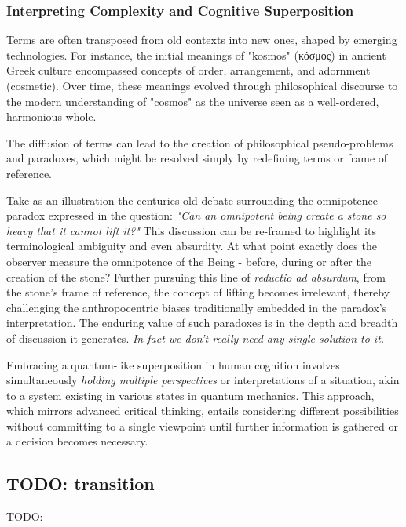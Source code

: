 \documentclass[11pt,a4]{article}
\newcommand{\textgreek}[1]{\begingroup\fontencoding{LGR}\selectfont#1\endgroup}
\begin{document}
    \subsubsection{Interpreting Complexity and Cognitive Superposition}
        \par
        Terms are often transposed from old contexts into new ones, shaped by emerging technologies.
        For instance,  the initial meanings of "kosmos" (\textgreek{κόσμος}) in ancient Greek culture encompassed concepts of order, arrangement, and adornment (cosmetic). Over time, these meanings evolved through philosophical discourse to the modern understanding of "cosmos" as the universe seen as a well-ordered, harmonious whole.
        \par
        The diffusion of  terms can lead to the creation of philosophical pseudo-problems and paradoxes, which might be resolved simply by redefining terms or frame of reference.
        \par

        Take as an illustration the centuries-old debate surrounding the
        omnipotence paradox expressed in the question: \textit{"Can an omnipotent being create a stone so heavy that it cannot lift it?"} This discussion can be re-framed to highlight its terminological ambiguity and even absurdity.
        At what point exactly does the observer measure the omnipotence of the Being - before, during or after the creation of the stone?
        Further pursuing this line of \textit{reductio ad absurdum}, from the stone's frame of reference, the concept of lifting becomes irrelevant, thereby challenging the anthropocentric biases traditionally embedded in the paradox’s interpretation.
        The enduring value of such paradoxes is in the depth and breadth of discussion it generates. \textit{In fact we don't really need any single solution to it.}
        \par

        Embracing a quantum-like superposition in human cognition involves simultaneously \textit{holding multiple perspectives} or interpretations of a situation, akin to a system existing in various states in quantum mechanics. This approach, which mirrors advanced critical thinking, entails considering different possibilities without committing to a single viewpoint until further information is gathered or a decision becomes necessary.

\subsection{TODO: transition}
TODO:
\end{document}
